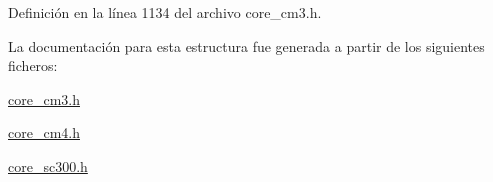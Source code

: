 Definición en la línea 1134 del archivo core\+\_\+cm3.\+h.



La documentación para esta estructura fue generada a partir de los siguientes ficheros\+:\begin{DoxyCompactItemize}
\item 
\hyperlink{core__cm3_8h}{core\+\_\+cm3.\+h}\item 
\hyperlink{core__cm4_8h}{core\+\_\+cm4.\+h}\item 
\hyperlink{core__sc300_8h}{core\+\_\+sc300.\+h}\end{DoxyCompactItemize}
